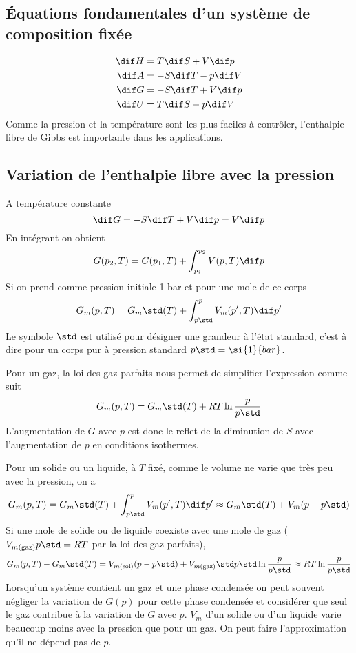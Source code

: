 \subsection{Équations fondamentales d'un système de composition fixée}
\begin{align}
  \nonumber
  \dif H & = T\dif S+V\dif p\\
  \nonumber
  \dif A & = -S\dif T -p\dif V\\
  \label{eq:fondG}
  \dif G & = -S\dif T +V\dif p\\
  \nonumber
  \dif U & = T\dif S-p\dif V
\end{align}
Comme la pression et la température sont les plus faciles à contrôler,
l'enthalpie libre de Gibbs est importante dans les applications.

\subsection{Variation de l'enthalpie libre avec la pression}
A température constante
\[ \dif G = -S\dif T+V\dif p = V\dif p \]
En intégrant on obtient
\[ G(p_2,T) = G(p_1,T)+\int_{p_i}^{p_2}V(p,T)\dif p \]
Si on prend comme pression initiale 1 bar et pour une mole de ce corps
\[ G_m(p,T) = G_m\std(T)+\int_{p\std}^{p}V_m(p',T)\dif p' \]
Le symbole $\std$ est utilisé pour désigner une grandeur à l'état standard,
c'est à dire pour un corps pur à pression standard $p\std = \si{1}{bar}$.

Pour un gaz, la loi des gaz parfaits nous permet de simplifier l'expression
comme suit
\[ G_m(p,T) = G_m\std(T)+RT \ln \frac{p}{p\std} \]
L'augmentation de $G$ avec $p$ est donc le reflet de la diminution de $S$
avec l'augmentation de $p$ en conditions isothermes.

Pour un solide ou un liquide, à $T$ fixé,
comme le volume ne varie que très peu avec la pression, on a
\[ G_m(p,T) = G_m\std(T)+\int_{p\std}^{p}V_m(p',T)\dif p'
\approx G_m\std(T)+V_m(p-p\std) \]
Si une mole de solide ou de liquide coexiste avec une mole de gaz
($V_{m(\mathrm{gaz})} p\std = RT$ par la loi des gaz parfaits),
\[ G_m(p,T) - G_m\std(T) = V_{m(\mathrm{sol})}(p-p\std)+
V_{m(\mathrm{gaz})}\std p\std\ln \frac{p}{p\std}
\approx RT \ln \frac{p}{p\std} \]
Lorsqu'un système contient un gaz et une phase condensée
on peut souvent négliger la variation de $G(p)$ pour cette phase condensée
et considérer que seul le gaz contribue à la variation de $G$ avec $p$.
$V_m$ d'un solide ou d'un liquide varie beaucoup
moins avec la pression que pour un gaz.
On peut faire l'approximation qu'il ne dépend pas de $p$.

